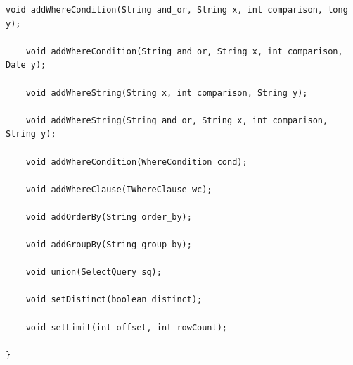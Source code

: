 \begin{lstlisting}[title=código interfaz UpdateStatement]
	void addWhereCondition(String and_or, String x, int comparison, long y);

	void addWhereCondition(String and_or, String x, int comparison, Date y);

	void addWhereString(String x, int comparison, String y);

	void addWhereString(String and_or, String x, int comparison, String y);

	void addWhereCondition(WhereCondition cond);

	void addWhereClause(IWhereClause wc);

	void addOrderBy(String order_by);

	void addGroupBy(String group_by);

	void union(SelectQuery sq);

	void setDistinct(boolean distinct);

	void setLimit(int offset, int rowCount);

}
\end{lstlisting}
